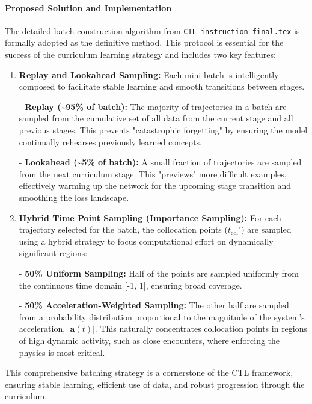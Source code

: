 \documentclass[11pt, a4paper]{article}
\begin{document}
\paragraph{Proposed Solution and Implementation}
The detailed batch construction algorithm from \texttt{CTL-instruction-\allowbreak final.tex} is formally adopted as the definitive method. This protocol is essential for the success of the curriculum learning strategy and includes two key features:
\begin{enumerate}
    \item \textbf{Replay and Lookahead Sampling:} Each mini-batch is intelligently composed to facilitate stable learning and smooth transitions between stages.
    
        
- \textbf{Replay (\textasciitilde 95\% of batch):} The majority of trajectories in a batch are sampled from the cumulative set of all data from the current stage and all previous stages. This prevents "catastrophic forgetting" by ensuring the model continually rehearses previously learned concepts.
        
- \textbf{Lookahead (\textasciitilde 5\% of batch):} A small fraction of trajectories are sampled from the next curriculum stage. This "previews" more difficult examples, effectively warming up the network for the upcoming stage transition and smoothing the loss landscape.
    
    \item \textbf{Hybrid Time Point Sampling (Importance Sampling):} For each trajectory selected for the batch, the collocation points ($t_{\text{col}}'$) are sampled using a hybrid strategy to focus computational effort on dynamically significant regions:
    
        
- \textbf{50\% Uniform Sampling:} Half of the points are sampled uniformly from the continuous time domain [-1, 1], ensuring broad coverage.
        
- \textbf{50\% Acceleration-Weighted Sampling:} The other half are sampled from a probability distribution proportional to the magnitude of the system's acceleration, $|\mathbf{a}(t)|$. This naturally concentrates collocation points in regions of high dynamic activity, such as close encounters, where enforcing the physics is most critical.
    
\end{enumerate}
This comprehensive batching strategy is a cornerstone of the CTL framework, ensuring stable learning, efficient use of data, and robust progression through the curriculum.
\end{document}
